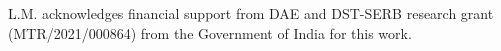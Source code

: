 \documentclass[journal=aesccq,manuscript=article,layout=twocolumn]{achemso}
\begin{document}
\begin{acknowledgement}
L.M. acknowledges financial support from DAE and DST-SERB research grant (MTR/2021/000864) from the Government of India for this work. 


\end{acknowledgement}



\end{document}
